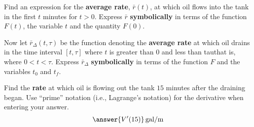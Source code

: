 \documentclass{ximera}
\begin{document}
\begin{exercise}
\begin{exercise}
\begin{exercise}
\begin{exercise}
\begin{exercise}
\begin{exercise}
\begin{exercise}
Find an expression for the \textbf{average rate}, $\bar{r}(t)$, at which oil flows into the tank in the first $t$ minutes for $t>0$. Express $\bar{r}$ \textbf{symbolically} in terms of the function $F(t)$, the variable $t$ and the quantity $F(0)$.
\begin{multipleChoice}
\end{multipleChoice}
\begin{exercise}
Now let $\bar{r}_{\Delta}(t,\tau)$ be the function denoting the \textbf{average rate} at which oil drains in the time interval $[t,\tau]$ where $t$ is greater than $0$ and less than tau\textemdash that is, where $0<t<\tau$. Express $\bar{r}_{\Delta}$ \textbf{symbolically} in terms of the function $F$ and the variables $t_0$ and $t_f$.
\begin{multipleChoice}
\end{multipleChoice}
\begin{exercise}
Find the \textbf{rate} at which oil is flowing out the tank $15$ minutes after the draining began. Use ``prime'' notation (i.e., Lagrange's notation) for the derivative when entering your answer.
\[
\answer{V'(15)}\unit{gal/m}
\]
\end{exercise}
\end{exercise}
\end{exercise}
\end{exercise}
\end{exercise}
\end{exercise}
\end{exercise}
\end{exercise}
\end{exercise}
\end{document}
